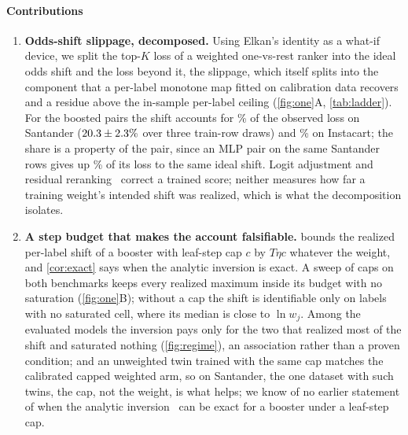 \documentclass[sigconf,nonacm]{acmart}
\begin{document}
\paragraph{Contributions}
\begin{enumerate}[leftmargin=*,nosep]
\item \textbf{Odds-shift slippage, decomposed.} Using Elkan's identity as a what-if device, we split the top-$K$ loss of a weighted one-vs-rest ranker into the ideal odds shift and the loss beyond it, the slippage, which itself splits into the component that a per-label monotone map fitted on calibration data recovers and a residue above the in-sample per-label ceiling (\cref{fig:one}A, \cref{tab:ladder}). For the boosted pairs the shift accounts for \noddsShare\% of the observed loss on Santander ($20.3 \pm 2.3\%$ over three train-row draws) and \nIoddsShare\% on Instacart; the share is a property of the pair, since an MLP pair on the same Santander rows gives up \nModdsShare\% of its loss to the same ideal shift. Logit adjustment and residual reranking~\cite{Menon2021LogitAdjust,Wang2026BeyondLA} correct a trained score; neither measures how far a training weight's intended shift was realized, which is what the decomposition isolates.
\item \textbf{A step budget that makes the account falsifiable.}  bounds the realized per-label shift of a booster with leaf-step cap $c$ by $T\eta c$ whatever the weight, and \cref{cor:exact} says when the analytic inversion is exact. A sweep of \ncapN{} caps on both benchmarks keeps every realized maximum inside its budget with no saturation (\cref{fig:one}B); without a cap the shift is identifiable only on labels with no saturated cell, where its median is close to $\ln w_j$. Among the evaluated models the inversion pays only for the two that realized most of the shift and saturated nothing (\cref{fig:regime}), an association rather than a proven condition; and an unweighted twin trained with the same cap matches the calibrated capped weighted arm, so on Santander, the one dataset with such twins, the cap, not the weight, is what helps; we know of no earlier statement of when the analytic inversion~\cite{Elkan2001} can be exact for a booster under a leaf-step cap.

\end{enumerate}
\end{document}
